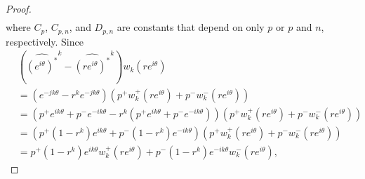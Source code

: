 \documentclass[10pt,a4paper]{amsart}
\begin{document}
\begin{proof}
\begin{align*}
        \end{align*}
        where $C_p$, $C_{p,n}$, and $D_{p,n}$ are constants that depend on only $p$ or $p$ and $n$, respectively. Since
        \begin{align*}
            & (\widehat{(e^{i\theta})^*}^k -  \widehat{(re^{i\theta})^*}^k )w_k(re^{i\theta}) \\
            &= (e^{-jk\theta} - r^k e^{-jk\theta}) (p^+ w_k^+(re^{i\theta}) + p^- w_k^-(re^{i\theta})) \\
            &= (p^+ e^{ik\theta} + p^- e^{-ik\theta} - r^k (p^+ e^{ik\theta} + p^- e^{-ik\theta})) (p^+ w_k^+(re^{i\theta}) + p^- w_k^-(re^{i\theta})) \\
            &= (p^+ (1-r^k)e^{ik\theta} + p^- (1-r^k)e^{-ik\theta} ) (p^+ w_k^+(re^{i\theta}) + p^- w_k^-(re^{i\theta})) \\
            &= p^+ (1-r^k)e^{ik\theta}w_k^+(re^{i\theta}) + p^- (1-r^k)e^{-ik\theta} w_k^-(re^{i\theta}),
        \end{align*}


\end{proof}
\end{document}
